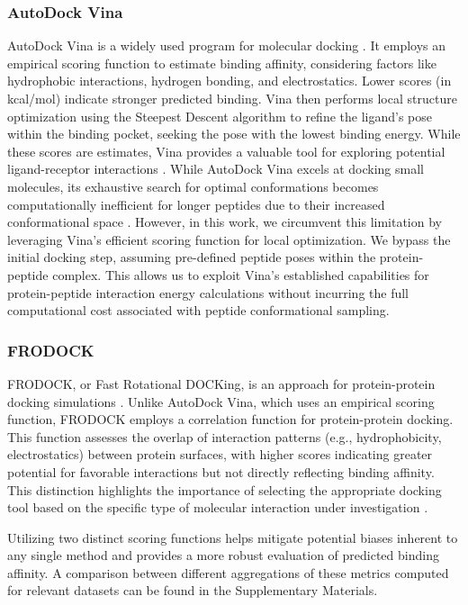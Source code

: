 \vspace{4pt} \noindent
\subsubsection{AutoDock Vina}
AutoDock Vina is a widely used program for molecular docking \cite{trott2010autodock}. It employs an empirical scoring function to estimate binding affinity, considering factors like hydrophobic interactions, hydrogen bonding, and electrostatics. Lower scores (in kcal/mol) indicate stronger predicted binding. Vina then performs local structure optimization using the Steepest Descent algorithm to refine the ligand's pose within the binding pocket, seeking the pose with the lowest binding energy. While these scores are estimates, Vina provides a valuable tool for exploring potential ligand-receptor interactions \cite{trott2010autodock}. While AutoDock Vina excels at docking small molecules, its exhaustive search for optimal conformations becomes computationally inefficient for longer peptides due to their increased conformational space \cite{rentzsch2015docking}. However, in this work, we circumvent this limitation by leveraging Vina's efficient scoring function for local optimization. We bypass the initial docking step, assuming pre-defined peptide poses within the protein-peptide complex. This allows us to exploit Vina's established capabilities for protein-peptide interaction energy calculations without incurring the full computational cost associated with peptide conformational sampling.

\vspace{4pt} \noindent
\subsubsection{FRODOCK}
FRODOCK, or Fast Rotational DOCKing, is an approach for protein-protein docking simulations \cite{Aportela2016}. Unlike AutoDock Vina, which uses an empirical scoring function, FRODOCK employs a correlation function for protein-protein docking. This function assesses the overlap of interaction patterns (e.g., hydrophobicity, electrostatics) between protein surfaces, with higher scores indicating greater potential for favorable interactions but not directly reflecting binding affinity. This distinction highlights the importance of selecting the appropriate docking tool based on the specific type of molecular interaction under investigation \cite{Aportela2016}. 

\vspace{4pt} \noindent
Utilizing two distinct scoring functions helps mitigate potential biases inherent to any single method and provides a more robust evaluation of predicted binding affinity. 
A comparison between different aggregations of these metrics computed for relevant datasets can be found in the Supplementary Materials.

